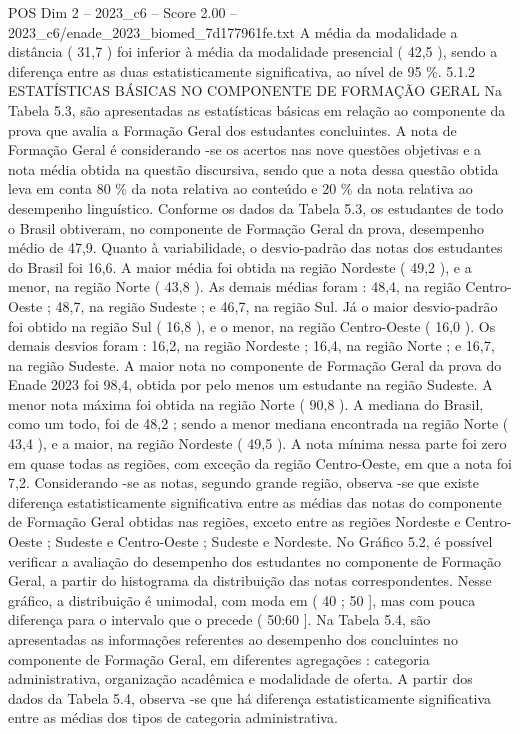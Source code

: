 \begin{textsample}{POS Dim 2 – 2023\_c6 – Score 2.00 – 2023\_c6/enade\_2023\_biomed\_7d177961fe.txt}
A média da modalidade a distância ( 31,7 ) foi inferior à média da modalidade presencial ( 42,5 ), sendo a diferença entre as duas estatisticamente significativa, ao nível de 95 \%. 5.1.2 ESTATÍSTICAS BÁSICAS NO COMPONENTE DE FORMAÇÃO GERAL Na Tabela 5.3, são apresentadas as estatísticas básicas em relação ao componente da prova que avalia a Formação Geral dos estudantes concluintes.
A nota de Formação Geral é considerando -se os acertos nas nove questões objetivas e a nota média obtida na questão discursiva, sendo que a nota dessa questão obtida leva em conta 80 \% da nota relativa ao conteúdo e 20 \% da nota relativa ao desempenho linguístico.
Conforme os dados da Tabela 5.3, os estudantes de todo o Brasil obtiveram, no componente de Formação Geral da prova, desempenho médio de 47,9.
Quanto à variabilidade, o desvio-padrão das notas dos estudantes do Brasil foi 16,6.
A maior média foi obtida na região Nordeste ( 49,2 ), e a menor, na região Norte ( 43,8 ).
As demais médias foram : 48,4, na região Centro-Oeste ; 48,7, na região Sudeste ; e 46,7, na região Sul.
Já o maior desvio-padrão foi obtido na região Sul ( 16,8 ), e o menor, na região Centro-Oeste ( 16,0 ).
Os demais desvios foram : 16,2, na região Nordeste ; 16,4, na região Norte ; e 16,7, na região Sudeste.
A maior nota no componente de Formação Geral da prova do Enade 2023 foi 98,4, obtida por pelo menos um estudante na região Sudeste.
A menor nota máxima foi obtida na região Norte ( 90,8 ).
A mediana do Brasil, como um todo, foi de 48,2 ; sendo a menor mediana encontrada na região Norte ( 43,4 ), e a maior, na região Nordeste ( 49,5 ).
A nota mínima nessa parte foi zero em quase todas as regiões, com exceção da região Centro-Oeste, em que a nota foi 7,2.
Considerando -se as notas, segundo grande região, observa -se que existe diferença estatisticamente significativa entre as médias das notas do componente de Formação Geral obtidas nas regiões, exceto entre as regiões Nordeste e Centro-Oeste ; Sudeste e Centro-Oeste ; Sudeste e Nordeste.
No Gráfico 5.2, é possível verificar a avaliação do desempenho dos estudantes no componente de Formação Geral, a partir do histograma da distribuição das notas correspondentes.
Nesse gráfico, a distribuição é unimodal, com moda em ( 40 ; 50 ], mas com pouca diferença para o intervalo que o precede ( 50:60 ].
Na Tabela 5.4, são apresentadas as informações referentes ao desempenho dos concluintes no componente de Formação Geral, em diferentes agregações : categoria administrativa, organização acadêmica e modalidade de oferta.
A partir dos dados da Tabela 5.4, observa -se que há diferença estatisticamente significativa entre as médias dos tipos de categoria administrativa.

\end{textsample}
